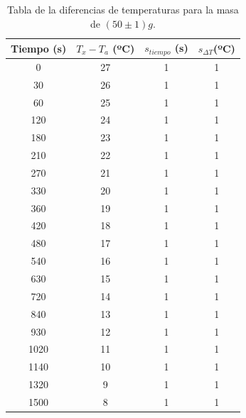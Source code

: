 \documentclass[a4paper]{article}
\begin{document}
\begin{table}[H]
  \centering
    \begin{tabular}{|c|c|c|c|} \hline
    Tiempo (s) & $T_x - T_a$ (ºC) & $s_{tiempo }$ (s) &  $s_{ \Delta T} $(ºC) \\ \hline
    0     & 27    & 1     & 1 \\ \hline
    30    & 26    & 1     & 1 \\ \hline
    60    & 25    & 1     & 1 \\ \hline
    120   & 24    & 1     & 1 \\ \hline
    180   & 23    & 1     & 1 \\ \hline
    210   & 22    & 1     & 1 \\ \hline
    270   & 21    & 1     & 1 \\ \hline
    330   & 20    & 1     & 1 \\ \hline
    360   & 19    & 1     & 1 \\ \hline
    420   & 18    & 1     & 1 \\ \hline
    480   & 17    & 1     & 1 \\ \hline
    540   & 16    & 1     & 1 \\ \hline
    630   & 15    & 1     & 1 \\ \hline
    720   & 14    & 1     & 1 \\ \hline
    840   & 13    & 1     & 1 \\ \hline
    930   & 12    & 1     & 1 \\ \hline
    1020  & 11    & 1     & 1 \\ \hline
    1140  & 10    & 1     & 1 \\ \hline
    1320  & 9     & 1     & 1 \\ \hline
    1500  & 8     & 1     & 1 \\ \hline
    \end{tabular}%
  \caption{Tabla de la diferencias de temperaturas para la masa de $(50\pm 1)g$.}
\end{table}%
\end{document}
